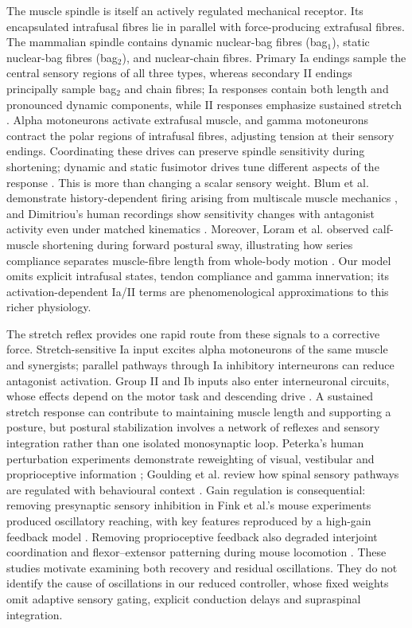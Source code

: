 \documentclass{styles/svproc}
\begin{document}
The muscle spindle is itself an actively regulated mechanical receptor. Its encapsulated intrafusal fibres lie in parallel with force-producing extrafusal fibres. The mammalian spindle contains dynamic nuclear-bag fibres (bag$_1$), static nuclear-bag fibres (bag$_2$), and nuclear-chain fibres. Primary Ia endings sample the central sensory regions of all three types, whereas secondary II endings principally sample bag$_2$ and chain fibres; Ia responses contain both length and pronounced dynamic components, while II responses emphasize sustained stretch \cite{mileusnic2006spindle}. Alpha motoneurons activate extrafusal muscle, and gamma motoneurons contract the polar regions of intrafusal fibres, adjusting tension at their sensory endings. Coordinating these drives can preserve spindle sensitivity during shortening; dynamic and static fusimotor drives tune different aspects of the response \cite{marasco2023,mileusnic2006spindle}. This is more than changing a scalar sensory weight. Blum et al. demonstrate history-dependent firing arising from multiscale muscle mechanics \cite{blum2020}, and Dimitriou's human recordings show sensitivity changes with antagonist activity even under matched kinematics \cite{dimitriou2014}. Moreover, Loram et al. observed calf-muscle shortening during forward postural sway, illustrating how series compliance separates muscle-fibre length from whole-body motion \cite{loram2005}. Our model omits explicit intrafusal states, tendon compliance and gamma innervation; its activation-dependent Ia/II terms are phenomenological approximations to this richer physiology.

The stretch reflex provides one rapid route from these signals to a corrective force. Stretch-sensitive Ia input excites alpha motoneurons of the same muscle and synergists; parallel pathways through Ia inhibitory interneurons can reduce antagonist activation. Group II and Ib inputs also enter interneuronal circuits, whose effects depend on the motor task and descending drive \cite{goulding2025}. A sustained stretch response can contribute to maintaining muscle length and supporting a posture, but postural stabilization involves a network of reflexes and sensory integration rather than one isolated monosynaptic loop. Peterka's human perturbation experiments demonstrate reweighting of visual, vestibular and proprioceptive information \cite{peterka2002}; Goulding et al. review how spinal sensory pathways are regulated with behavioural context \cite{goulding2025}. Gain regulation is consequential: removing presynaptic sensory inhibition in Fink et al.'s mouse experiments produced oscillatory reaching, with key features reproduced by a high-gain feedback model \cite{fink2014}. Removing proprioceptive feedback also degraded interjoint coordination and flexor--extensor patterning during mouse locomotion \cite{akay2014}. These studies motivate examining both recovery and residual oscillations. They do not identify the cause of oscillations in our reduced controller, whose fixed weights omit adaptive sensory gating, explicit conduction delays and supraspinal integration.
\end{document}
